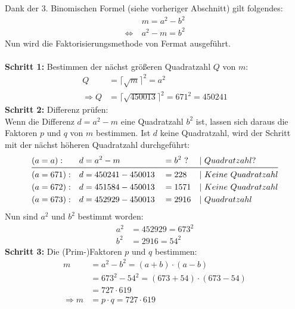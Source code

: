 Dank der 3. Binomischen Formel (siehe vorheriger Abschnitt) gilt folgendes:
\begin{align*}
&m=a^{2}-b^{2}\\
\Leftrightarrow~&a^{2}-m=b^{2} 
\end{align*}
Nun wird die Faktorisierungsmethode von Fermat ausgeführt.\\
\\
\textbf{Schritt 1:} Bestimmen der nächst größeren Quadratzahl $Q$ von $m$:
\begin{align*}
Q&=\Big\lceil \sqrt{m}\Big\rceil^{2}=a^{2}\\
\Rightarrow Q&=\Big\lceil \sqrt{450013}\Big\rceil^{2}=671^{2}=450241
\end{align*}
\textbf{Schritt 2:} Differenz prüfen:\\
Wenn die Differenz $d=a^{2}-m$ eine Quadratzahl $b^{2}$ ist, lassen sich daraus die Faktoren $p$ und $q$ von $m$ bestimmen. Ist $d$ keine Quadratzahl, wird der Schritt mit der nächst höheren Quadratzahl durchgeführt:
\begin{align*}
(a &=a):   &  d &= a^{2}  - m       & &=b^{2}~? & &|~Quadratzahl?\\
\midrule
(a &=671): &  d &= 450241 - 450013  & &=228     & &|~Keine~Quadratzahl\\
(a &=672): &  d &= 451584 - 450013  & &=1571    & &|~Keine~Quadratzahl\\
(a &=673): &  d &= 452929 - 450013  & &=2916    & &|~Quadratzahl
\end{align*}
Nun sind $a^{2}$ und $b^{2}$ bestimmt worden:
\begin{align*}
a^{2} &= 452929 =673^{2}\\
b^{2} &= 2916 =54^{2}
\end{align*}
\textbf{Schritt 3:} Die (Prim-)Faktoren $p$ und $q$ bestimmen:
\begin{align*}
m &= a^{2}-b^{2} = (a+b) \cdot (a-b)\\
  &= 673^{2}-54^{2} = (673+54) \cdot (673-54)\\
  &= 727 \cdot 619\\
\Rightarrow m &=p \cdot q = 727 \cdot 619
\end{align*}
